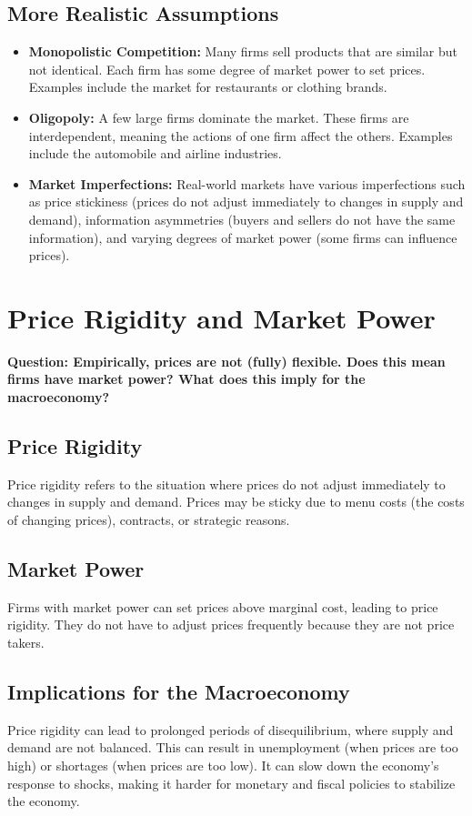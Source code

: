 \documentclass{article}
\begin{document}
\subsection{More Realistic Assumptions}
\begin{itemize}
    \item \textbf{Monopolistic Competition:} Many firms sell products that are similar but not identical. Each firm has some degree of market power to set prices. Examples include the market for restaurants or clothing brands.
    \item \textbf{Oligopoly:} A few large firms dominate the market. These firms are interdependent, meaning the actions of one firm affect the others. Examples include the automobile and airline industries.
    \item \textbf{Market Imperfections:} Real-world markets have various imperfections such as price stickiness (prices do not adjust immediately to changes in supply and demand), information asymmetries (buyers and sellers do not have the same information), and varying degrees of market power (some firms can influence prices).
\end{itemize}

\section{Price Rigidity and Market Power}
\textbf{Question: Empirically, prices are not (fully) flexible. Does this mean firms have market power? What does this imply for the macroeconomy?}

\subsection{Price Rigidity}
Price rigidity refers to the situation where prices do not adjust immediately to changes in supply and demand. Prices may be sticky due to menu costs (the costs of changing prices), contracts, or strategic reasons.

\subsection{Market Power}
Firms with market power can set prices above marginal cost, leading to price rigidity. They do not have to adjust prices frequently because they are not price takers.

\subsection{Implications for the Macroeconomy}
Price rigidity can lead to prolonged periods of disequilibrium, where supply and demand are not balanced. This can result in unemployment (when prices are too high) or shortages (when prices are too low). It can slow down the economy's response to shocks, making it harder for monetary and fiscal policies to stabilize the economy.
\end{document}
